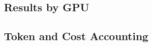 \subsection{Results by GPU}
\begin{table}[H]
\centering

\end{table}

\subsection{Token and Cost Accounting}
\begin{table}[H]
\centering

\end{table}
